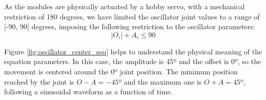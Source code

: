 As the modules are physically actuated by a hobby servo, with a mechanical restriction of 180 degrees, we have limited the oscillator joint values to  a range of [-90, 90] degrees, imposing the following restriction to the oscillator parameters:
\begin{equation} \label{eq:oscillator_restriction}
|O_i| + A_i \leq 90
\end{equation}

\newpage
Figure \ref{fig:oscillator_center_seq} helps to understand the physical meaning of the equation parameters. In this case, the amplitude is 45º and the offset is 0º, so the movement is centered around the 0º joint position. The minimum position reached by the joint is $ O - A = -45º$ and the maximum one is $O + A = 45º$, following a sinusoidal waveform as a function of time.\\

